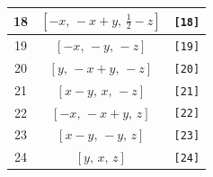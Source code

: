 \documentclass[fleqn,8pt]{jsarticle}
\begin{document}
\begin{longtable}{ccc}
18 & $\left[ - x,\, - x + y,\, \frac{1}{2} - z \right]$ & {\tt [18]} \\ \hline
19 & $\left[ - x,\, - y,\, - z \right]$ & {\tt [19]} \\ \hline
20 & $\left[ y,\, - x + y,\, - z \right]$ & {\tt [20]} \\ \hline
21 & $\left[ x - y,\, x,\, - z \right]$ & {\tt [21]} \\ \hline
22 & $\left[ - x,\, - x + y,\, z \right]$ & {\tt [22]} \\ \hline
23 & $\left[ x - y,\, - y,\, z \right]$ & {\tt [23]} \\ \hline
24 & $\left[ y,\, x,\, z \right]$ & {\tt [24]} \\
\end{longtable}
\end{document}
